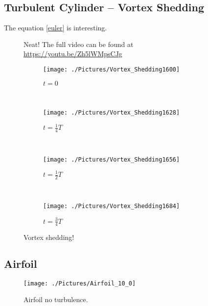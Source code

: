 \documentclass[10pt]{article}
\begin{document}
\subsection{Turbulent Cylinder -- Vortex Shedding}

The equation \eqref{euler} is interesting.

\begin{wrapfigure}{R}{0.6\textwidth}
\centering
{}
\caption[Vortex Shedding Animation]{Neat! The full video can be found at \url{https://youtu.be/Zh5lWMpsCJg}}
\label{vortexanimation}
\end{wrapfigure}

\lipsum[1-2]

\begin{figure}
\begin{subfigure}{\linewidth}
  \centering
  \texttt{[image: ./Pictures/Vortex\_Shedding1600]}
  \caption{$t = 0$}
\end{subfigure} \\
\begin{subfigure}{\textwidth}
  \centering
  \texttt{[image: ./Pictures/Vortex\_Shedding1628]}
  \caption{$t = \frac{1}{4}T$}
\end{subfigure} \\
\begin{subfigure}{\linewidth}
  \centering
  \texttt{[image: ./Pictures/Vortex\_Shedding1656]}
  \caption{$t = \frac{1}{2}T$}
\end{subfigure} \\
\begin{subfigure}{\textwidth}
  \centering
  \texttt{[image: ./Pictures/Vortex\_Shedding1684]}
  \caption{$t = \frac{3}{4}T$}
\end{subfigure}
\caption[Vortex Shedding at $\frac{1}{4}T$ increments]{Vortex shedding!}
\label{fig:vortexshedding}
\end{figure}

\subsection{Airfoil}
\lipsum[1-2]

\begin{figure}[ht]
\centering
\texttt{[image: ./Pictures/Airfoil\_10\_0]}
\caption[Airfoil, No Turbulence]{Airfoil no turbulence.}
\label{airfoil}
\end{figure}
\end{document}
